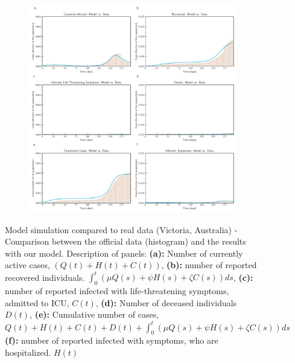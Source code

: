 \documentclass[fleqn,10pt]{wlscirep}
\begin{document}
\begin{figure}[t!]
	\centering
	\begin{subfigure}[b]{\textwidth}
		\centering
		\includegraphics[width=1\linewidth]{Victoria_plot_model_data.pdf}
	\end{subfigure}
	\caption{Model simulation compared to real data (Victoria, Australia) - Comparison between the official data (histogram) and the results with our model. Description of panels: \textbf{(a):} Number of currently active cases, $\left( Q(t) + H(t) + C(t)\right)$, \textbf{(b):} number of reported recovered individuals. $\int_{0}^{t}{\left( \mu Q(s) + \psi H(s) + \zeta  C(s) \right) ds}$, \textbf{(c):} number of reported infected with life-threatening symptoms, admitted to ICU, $C(t)$, \textbf{(d):} Number of deceased individuals $D(t)$, \textbf{(e):} Cumulative number of cases, $Q(t) + H(t) + C(t) + D(t) + \int_{0}^{t}{\left( \mu Q(s) + \psi H(s) + \zeta  C(s) \right) ds}$ \textbf{(f):} number of reported infected with symptoms, who are hospitalized. $H(t)$}
	\label{fig10A} 
\end{figure}
%
%
\end{document}
